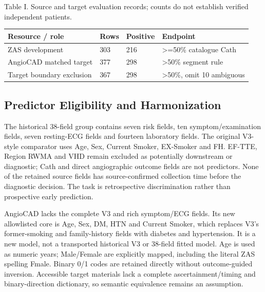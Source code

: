 \documentclass[conference]{IEEEtran}
\begin{document}
\begin{center}\begin{minipage}{\columnwidth}\centering\footnotesize
Table I. Source and target evaluation records; counts do not establish verified independent patients.\par\vspace{3pt}
\setlength{\tabcolsep}{2.5pt}
\begin{tabular}{p{}p{}p{}p{}}
\toprule
Resource / role & Rows & Positive & Endpoint \\
\midrule
ZAS development & 303 & 216 & >=50\% catalogue Cath \\
AngioCAD matched target & 377 & 298 & >50\% segment rule \\
Target boundary exclusion & 367 & 298 & >50\%, omit 10 ambiguous \\
\bottomrule
\end{tabular}
\end{minipage}\end{center}
\subsection{Predictor Eligibility and Harmonization}
The historical 38-field group contains seven risk fields, ten symptom/examination fields, seven resting-ECG fields and fourteen laboratory fields. The original V3-style comparator uses Age, Sex, Current Smoker, EX-Smoker and FH. EF-TTE, Region RWMA and VHD remain excluded as potentially downstream or diagnostic; Cath and direct angiographic outcome fields are not predictors. None of the retained source fields has source-confirmed collection time before the diagnostic decision. The task is retrospective discrimination rather than prospective early prediction.

AngioCAD lacks the complete V3 and rich symptom/ECG fields. Its new allowlisted core is Age, Sex, DM, HTN and Current Smoker, which replaces V3's former-smoking and family-history fields with diabetes and hypertension. It is a new model, not a transported historical V3 or 38-field fitted model. Age is used as numeric years; Male/Female are explicitly mapped, including the literal ZAS spelling Fmale. Binary 0/1 codes are retained directly without outcome-guided inversion. Accessible target materials lack a complete ascertainment/timing and binary-direction dictionary, so semantic equivalence remains an assumption.
\end{document}
